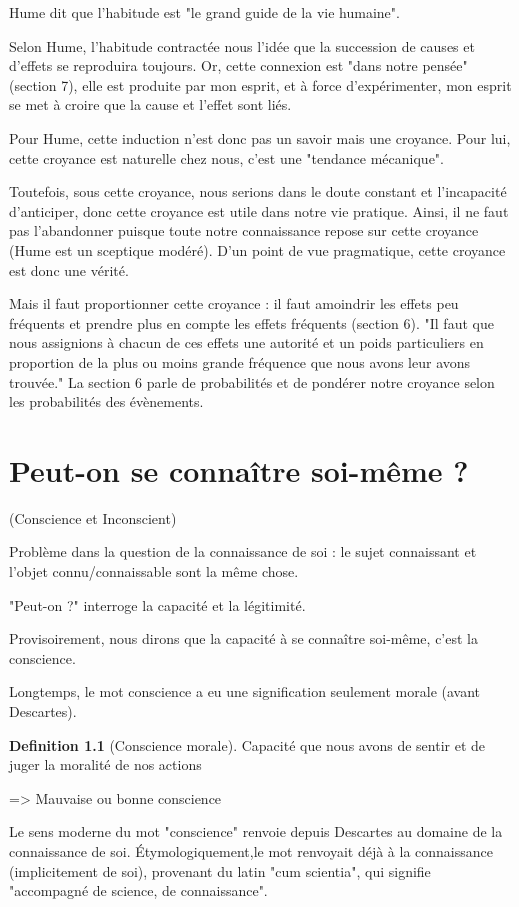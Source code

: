 \documentclass[french]{book}
\theoremstyle{definition}
\newtheorem*{dfn}{Definition}
\begin{document}
Hume dit que l'habitude est "le grand guide de la vie humaine".

Selon Hume, l'habitude contractée nous l'idée que la succession de causes et d'effets se reproduira toujours. Or, cette connexion est "dans notre pensée" (section 7), elle est produite par mon esprit, et à force d'expérimenter, mon esprit se met à croire que la cause et l'effet sont liés.

Pour Hume, cette induction n'est donc pas un savoir mais une croyance. Pour lui, cette croyance est naturelle chez nous, c'est une "tendance mécanique".

Toutefois, sous cette croyance, nous serions dans le doute constant et l'incapacité d'anticiper, donc cette croyance est utile dans notre vie pratique. Ainsi, il ne faut pas l'abandonner puisque toute notre connaissance repose sur cette croyance (Hume est un sceptique modéré). D'un point de vue pragmatique, cette croyance est donc une vérité.

Mais il faut proportionner cette croyance : il faut amoindrir les effets peu fréquents et prendre plus en compte les effets fréquents (section 6). "Il faut que nous assignions à chacun de ces effets une autorité et un poids particuliers en proportion de la plus ou moins grande fréquence que nous avons leur avons trouvée." La section 6 parle de probabilités et de pondérer notre croyance selon les probabilités des évènements.

\chapter{Peut-on se connaître soi-même ?}
(Conscience et Inconscient)

Problème dans la question de la connaissance de soi : le sujet connaissant et l'objet connu/connaissable sont la même chose.

"Peut-on ?" interroge la capacité et la légitimité.

Provisoirement, nous dirons que la capacité à se connaître soi-même, c'est la conscience.

Longtemps, le mot conscience a eu une signification seulement morale (avant Descartes).

\begin{dfn}[Conscience morale]
	Capacité que nous avons de sentir et de juger la moralité de nos actions
\end{dfn}

=> Mauvaise ou bonne conscience

Le sens moderne du mot "conscience" renvoie depuis Descartes au domaine de la connaissance de soi. Étymologiquement,le mot renvoyait déjà à la connaissance (implicitement de soi), provenant du latin "cum scientia", qui signifie "accompagné de science, de connaissance".
\end{document}
